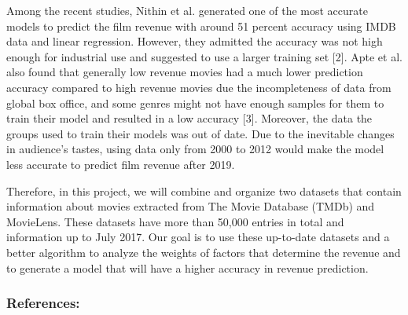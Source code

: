 \documentclass[11pt]{article}
\begin{document}
Among the recent studies, Nithin et al. generated one of the most
accurate models to predict the film revenue with around 51 percent
accuracy using IMDB data and linear regression. However, they admitted
the accuracy was not high enough for industrial use and suggested to use
a larger training set {[}2{]}. Apte et al. also found that generally low
revenue movies had a much lower prediction accuracy compared to high
revenue movies due the incompleteness of data from global box office,
and some genres might not have enough samples for them to train their
model and resulted in a low accuracy {[}3{]}. Moreover, the data the
groups used to train their models was out of date. Due to the inevitable
changes in audience's tastes, using data only from 2000 to 2012 would
make the model less accurate to predict film revenue after 2019.

Therefore, in this project, we will combine and organize two datasets
that contain information about movies extracted from The Movie Database
(TMDb) and MovieLens. These datasets have more than 50,000 entries in
total and information up to July 2017. Our goal is to use these
up-to-date datasets and a better algorithm to analyze the weights of
factors that determine the revenue and to generate a model that will
have a higher accuracy in revenue prediction.

\subsubsection{References:}\label{references}
\end{document}
